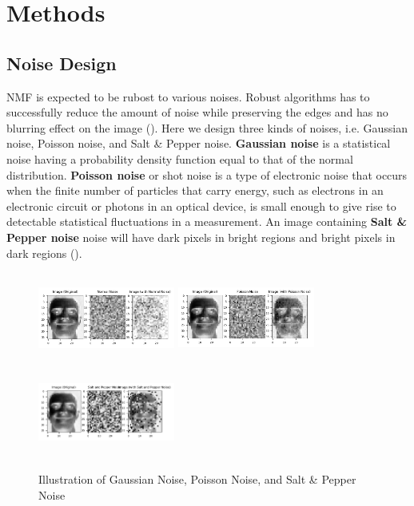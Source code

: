 \section{Methods \label{chapter2}}
\subsection{Noise Design}
\textsc{NMF} is expected to be rubost to various noises. Robust algorithms has to successfully reduce the amount of noise while preserving the edges and has no blurring effect on the image (\citet{barbu2013variational}). Here we design three kinds of noises, i.e. Gaussian noise, Poisson noise, and Salt \& Pepper noise. \newline 
\textbf{Gaussian noise} is a statistical noise having a probability density function equal to that of the normal distribution. \textbf{Poisson noise} or shot noise is a type of electronic noise that
occurs when the finite number of particles that carry energy,
such as electrons in an electronic circuit or photons in an optical
device, is small enough to give rise to detectable statistical
fluctuations in a measurement. An image containing \textbf{Salt \& Pepper noise} noise will have dark pixels
in bright regions and bright pixels in dark regions (\citet{sampat2005computer}).
\begin{figure}[h]
	\includegraphics[width=4.5cm, height=3cm]{Noise_ORL_Normal_Comparison.pdf}
	\includegraphics[width=4.5cm, height=3cm]{Noise_ORL_Poisson_Comparison.pdf}
	\includegraphics[width=4.5cm, height=3cm]{Noise_ORL_Salt_and_Pepper_Comparison.pdf}
	\caption{Illustration of Gaussian Noise, Poisson Noise, and Salt \& Pepper Noise}
	\label{fig:noise}
\end{figure}
